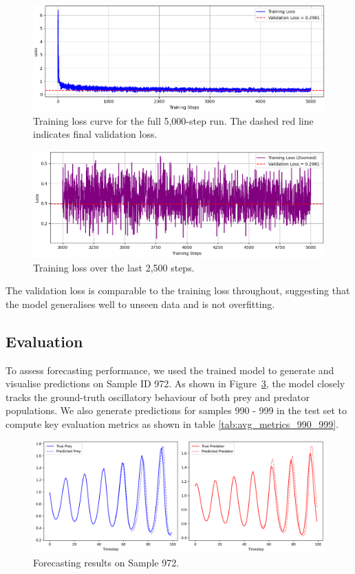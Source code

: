 \documentclass[a4paper,12pt]{article}
\begin{document}
\begin{figure}[H]
    \centering
    \includegraphics[width=0.85\linewidth]{training_loss.png}
    \caption{Training loss curve for the full 5,000-step run. The dashed red line indicates final validation loss.}
    \label{fig:training_loss}
\end{figure}

\begin{figure}[H]
    \centering
    \includegraphics[width=0.85\linewidth]{zoomed_training_loss.png}
    \caption{Training loss over the last 2,500 steps.}
    \label{fig:zoomed_training_loss}
\end{figure}

The validation loss is comparable to the training loss throughout, suggesting that the model generalises well to unseen data and is not overfitting.

\subsection*{Evaluation}

To assess forecasting performance, we used the trained model to generate and visualise predictions on Sample ID 972. As shown in Figure~\ref{fig:sample_prediction}, the model closely tracks the ground-truth oscillatory behaviour of both prey and predator populations.
We also generate predictions for samples 990 - 999 in the test set to compute key evaluation metrics as shown in table \ref{tab:avg_metrics_990_999}.

\begin{figure}[H]
    \centering
    \includegraphics[width=0.95\linewidth]{sample972_trained.png}
    \caption{Forecasting results on Sample 972.}
    \label{fig:sample_prediction}
\end{figure}
\end{document}
